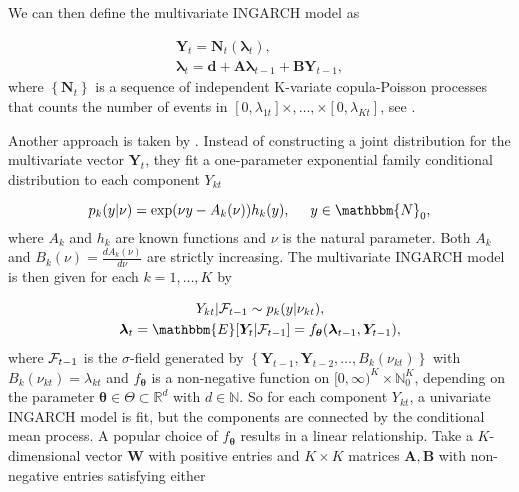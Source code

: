 We can then define the multivariate INGARCH model as

\begin{equation}
\begin{gathered}
\bm{Y}_t = \bm{N}_t(\bm{\lambda}_t), \\
\bm{\lambda}_t = \bm{d} + \bm{A}\bm{\lambda}_{t-1} + \bm{B}\bm{Y}_{t-1},
\label{eq:Mingarch 1 new}
\end{gathered}
\end{equation}
%
where $\left\{\bm{N}_t\right\}$ is a sequence of independent K-variate copula-Poisson processes that counts the number of events in $[0,\lambda_{1t}]\times,\ldots,\times[0,\lambda_{Kt}]$, see \textcite{Fokianos:2020}. 

Another approach is taken by \textcite{Lee:2023}. Instead of constructing a joint distribution for the multivariate vector $\bm{Y}_t$, they fit a one-parameter exponential family conditional distribution to each component $Y_{kt}$

\begin{equation}
p_{k}(y|\nu) = \exp(\nu y - A_k(\nu))h_k(y), \hspace{0.5cm} y \in \mathbbm{N}_0,
\label{eq:Exponential Family}
\end{equation}
where $A_k$ and $h_k$ are known functions and $\nu$ is the natural parameter. Both $A_k$ and $B_k(\nu) = \frac{d A_k(\nu)}{d \nu}$ are strictly increasing. The multivariate INGARCH model is then given for each $k=1,\ldots,K$ by

\begin{equation}
\begin{gathered}
Y_{kt} | \SigA_{t-1} \sim p_k(y|\nu_{kt}), \\
\bm{\lambda}_t = \mathbbm{E}[\bm{Y}_t | \SigA_{t-1}] = f_{\bm{\theta}}(\bm{\lambda}_{t-1},\bm{Y}_{t-1}),
\label{eq:Mingarch 2}
\end{gathered}
\end{equation}
%
where $\mathcal{F}_{t-1}$ is the $\sigma$-field generated by $\left\{\bm{Y}_{t-1},\bm{Y}_{t-2},\ldots,B_k(\nu_{kt})\right\}$ with $B_k(\nu_{kt})=\lambda_{kt}$ and $f_{\bm{\theta}}$ is a non-negative function on $[0,\infty)^K \times \mathbb{N}_0^K$, depending on the parameter $\bm{\theta} \in \Theta \subset \mathbb{R}^d$ with $d \in \mathbb{N}$. So for each component $Y_{kt}$, a univariate INGARCH model is fit, but the components are connected by the conditional mean process. A popular choice of $f_{\bm{\theta}}$ results in a linear relationship. Take a $K$-dimensional vector $\bm{W}$ with positive entries and $K\times K$ matrices $\bm{A},\bm{B}$ with non-negative entries satisfying either


